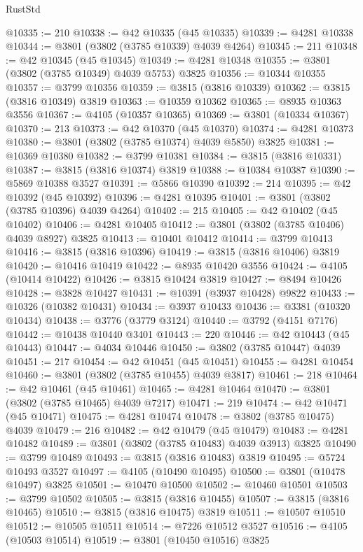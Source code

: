 \begin{lexlean}{RustStd}
\begin{coremodule}
@10335 := 210
@10338 := @42 @10335 (@45 @10335)
@10339 := @4281 @10338
@10344 := @3801 (@3802 (@3785 @10339) @4039 @4264)
@10345 := 211
@10348 := @42 @10345 (@45 @10345)
@10349 := @4281 @10348
@10355 := @3801 (@3802 (@3785 @10349) @4039 @5753) @3825
@10356 := @10344 @10355
@10357 := @3799 @10356
@10359 := @3815 (@3816 @10339)
@10362 := @3815 (@3816 @10349) @3819
@10363 := @10359 @10362
@10365 := @8935 @10363 @3556
@10367 := @4105 (@10357 @10365)
@10369 := @3801 (@10334 @10367)
@10370 := 213
@10373 := @42 @10370 (@45 @10370)
@10374 := @4281 @10373
@10380 := @3801 (@3802 (@3785 @10374) @4039 @5850) @3825
@10381 := @10369 @10380
@10382 := @3799 @10381
@10384 := @3815 (@3816 @10331)
@10387 := @3815 (@3816 @10374) @3819
@10388 := @10384 @10387
@10390 := @5869 @10388 @3527
@10391 := @5866 @10390
@10392 := 214
@10395 := @42 @10392 (@45 @10392)
@10396 := @4281 @10395
@10401 := @3801 (@3802 (@3785 @10396) @4039 @4264)
@10402 := 215
@10405 := @42 @10402 (@45 @10402)
@10406 := @4281 @10405
@10412 := @3801 (@3802 (@3785 @10406) @4039 @8927) @3825
@10413 := @10401 @10412
@10414 := @3799 @10413
@10416 := @3815 (@3816 @10396)
@10419 := @3815 (@3816 @10406) @3819
@10420 := @10416 @10419
@10422 := @8935 @10420 @3556
@10424 := @4105 (@10414 @10422)
@10426 := @3815 @10424 @3819
@10427 := @8494 @10426
@10428 := @3828 @10427
@10431 := @10391 (@3937 @10428) @9822
@10433 := @10326 (@10382 @10431)
@10434 := @3937 @10433
@10436 := @3381 (@10320 @10434)
@10438 := @3776 (@3779 @3124)
@10440 := @3792 (@4151 @7176)
@10442 := @10438 @10440 @3401
@10443 := 220
@10446 := @42 @10443 (@45 @10443)
@10447 := @4034 @10446
@10450 := @3802 (@3785 @10447) @4039
@10451 := 217
@10454 := @42 @10451 (@45 @10451)
@10455 := @4281 @10454
@10460 := @3801 (@3802 (@3785 @10455) @4039 @3817)
@10461 := 218
@10464 := @42 @10461 (@45 @10461)
@10465 := @4281 @10464
@10470 := @3801 (@3802 (@3785 @10465) @4039 @7217)
@10471 := 219
@10474 := @42 @10471 (@45 @10471)
@10475 := @4281 @10474
@10478 := @3802 (@3785 @10475) @4039
@10479 := 216
@10482 := @42 @10479 (@45 @10479)
@10483 := @4281 @10482
@10489 := @3801 (@3802 (@3785 @10483) @4039 @3913) @3825
@10490 := @3799 @10489
@10493 := @3815 (@3816 @10483) @3819
@10495 := @5724 @10493 @3527
@10497 := @4105 (@10490 @10495)
@10500 := @3801 (@10478 @10497) @3825
@10501 := @10470 @10500
@10502 := @10460 @10501
@10503 := @3799 @10502
@10505 := @3815 (@3816 @10455)
@10507 := @3815 (@3816 @10465)
@10510 := @3815 (@3816 @10475) @3819
@10511 := @10507 @10510
@10512 := @10505 @10511
@10514 := @7226 @10512 @3527
@10516 := @4105 (@10503 @10514)
@10519 := @3801 (@10450 @10516) @3825

\end{coremodule}
\end{lexlean}
